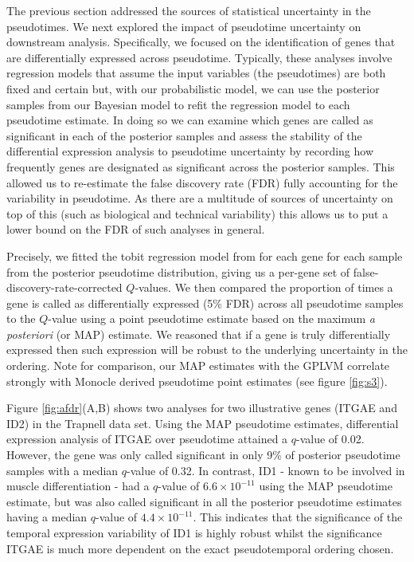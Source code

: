The previous section addressed the sources of statistical uncertainty in the pseudotimes. We next explored the impact of pseudotime uncertainty on downstream analysis. Specifically, we focused on the identification of genes that are differentially expressed across pseudotime. Typically, these analyses involve regression models that assume the input variables (the pseudotimes) are both fixed and certain but, with our probabilistic model, we can use the posterior samples from our Bayesian model to refit the regression model to each pseudotime estimate. In doing so we can examine which genes are called as significant in each of the posterior samples and assess the stability of the differential expression analysis to pseudotime uncertainty by recording how frequently genes are designated as significant across the posterior samples. This allowed us to re-estimate the false discovery rate (FDR)  fully accounting for the variability in pseudotime. As there are a multitude of sources of uncertainty on top of this (such as biological and technical variability) this allows us to put a lower bound on the FDR of such analyses in general.

Precisely, we fitted the tobit regression model from \cite{Trapnell2014-xi} for each gene for each sample from the posterior pseudotime distribution, giving us a per-gene set of false-discovery-rate-corrected $Q$-values. We then compared the proportion of times a gene is called as differentially expressed (5\% FDR) across all pseudotime samples to the $Q$-value using a point pseudotime estimate based on the maximum \textit{a posteriori} (or MAP) estimate. We reasoned that if a gene is truly differentially expressed then such expression will be robust to the underlying uncertainty in the ordering. Note for comparison, our MAP estimates with the GPLVM correlate strongly with Monocle derived pseudotime point estimates (see figure \ref{fig:s3}).

Figure \ref{fig:afdr}(A,B) shows two analyses for two illustrative genes  (ITGAE and ID2) in the Trapnell data set. Using the MAP pseudotime estimates, differential expression analysis of ITGAE over pseudotime attained a $q$-value of 0.02. However, the gene was only called significant in only 9\% of posterior pseudotime samples with a median $q$-value of 0.32. In contrast, ID1 - known to be involved in muscle differentiation - had a $q$-value of $6.6 \times 10^{-11}$ using the MAP pseudotime estimate, but was also called  significant in all the posterior pseudotime estimates having a median $q$-value of $4.4 \times 10^{-11}$. This indicates that the significance of the temporal expression variability of ID1 is highly robust whilst the significance ITGAE is much more dependent on the exact pseudotemporal ordering chosen.

